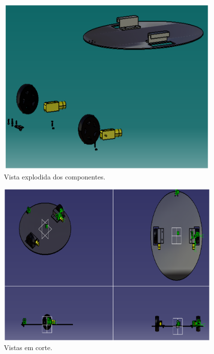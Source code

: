 \begin{figure}[H]
	\centering
	\includegraphics[scale=0.5]{figuras/vista_explodida.png}
	\caption{Vista explodida dos componentes.}
	\label{img:vista_explodida}
\end{figure}

\begin{figure}[H]
	\centering
	\includegraphics[scale=0.5]{figuras/vistas_em_corte.png}
	\caption{Vistas em corte.}
	\label{img:vistas_em_corte}
\end{figure}

